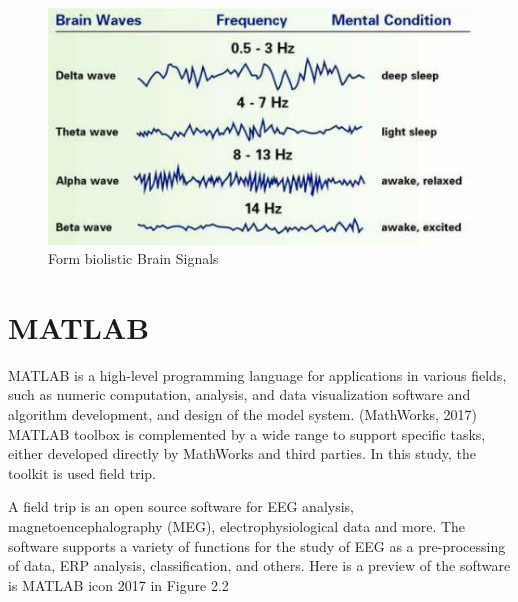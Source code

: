 \begin{enumerate}
    \begin{figure}[h!]
\centering
\includegraphics[scale=0.6]{figures/mengetahuigelombangotak.jpg}
\caption{Form biolistic Brain Signals}
\label{labelgambar1}
\end{figure}
\end{enumerate}

\section{MATLAB}
MATLAB is a high-level programming language for applications in various fields, such as numeric computation, analysis, and data visualization software and algorithm development, and design of the model system. (MathWorks, 2017) MATLAB toolbox is complemented by a wide range to support specific tasks, either developed directly by MathWorks and third parties. In this study, the toolkit is used field trip.

\par
A field trip is an open source software for EEG analysis, magnetoencephalography (MEG), electrophysiological data and more. The software supports a variety of functions for the study of EEG as a pre-processing of data, ERP analysis, classification, and others. Here is a preview of the software is MATLAB icon 2017 in Figure 2.2

